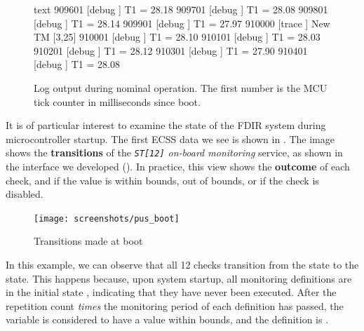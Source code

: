 \documentclass[a4paper,nobib]{tufte-book}
\begin{document}
\begin{figure}
\begin{cminted}{text}
909601  [debug  ] T1 = 28.18
909701  [debug  ] T1 = 28.08
909801  [debug  ] T1 = 28.14
909901  [debug  ] T1 = 27.97
910000  [trace  ] New TM [3,25]
910001  [debug  ] T1 = 28.10
910101  [debug  ] T1 = 28.03
910201  [debug  ] T1 = 28.12
910301  [debug  ] T1 = 27.90
910401  [debug  ] T1 = 28.08
\end{cminted}
\caption[Log output during nominal operation]{Log output during nominal operation. The first number is the \ac{MCU} tick counter in milliseconds since boot.}
\label{fig:lognominal}
\end{figure}


It is of particular interest to examine the state of the \acs{FDIR} system during microcontroller startup. The first \acs{ECSS} data we see is shown in . The image shows the \textbf{transitions} of the \emph{\texttt{ST[12]} on-board monitoring} service, as shown in the interface we developed (). In practice, this view shows the \textbf{outcome} of each check, and if the value is within bounds, out of bounds, or if the check is disabled.

\begin{figure}
	\texttt{[image: screenshots/pus\_boot]}
	\caption{Transitions made at boot}
	\label{fig:pus_boot}
\end{figure}

In this example, we can observe that all 12 checks transition from the \unchecked state to the \ok state. This happens because, upon system startup, all monitoring definitions are in the initial state \unchecked, indicating that they have never been executed. After the repetition count \emph{times} the monitoring period of each definition has passed, the variable is considered to have a value within bounds, and the definition is \ok.
\end{document}
